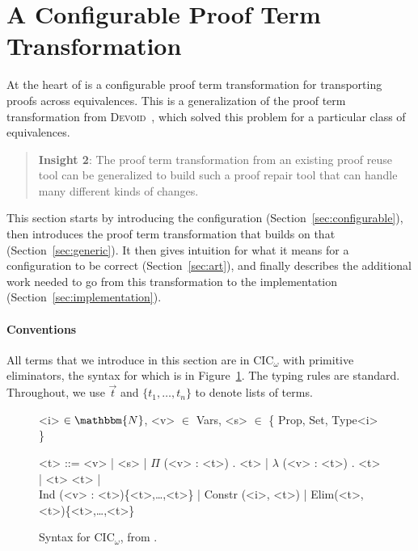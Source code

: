 \section{A Configurable Proof Term Transformation}
\label{sec:key2}

At the heart of \toolname is a configurable proof term transformation for transporting
proofs across equivalences. This is a generalization of the proof term transformation from 
\textsc{Devoid}~\cite{Ringer2019}, which solved this problem for a particular class of equivalences.

\begin{quote}
\textbf{Insight 2}:
The proof term transformation from an existing proof reuse tool can be generalized
to build such a proof repair tool that can handle 
many different kinds of changes.
\end{quote}

This section starts by introducing the configuration (Section~\ref{sec:configurable}),
then introduces the proof term transformation that builds on that (Section~\ref{sec:generic}).
It then gives intuition for what it means for a configuration to be correct (Section~\ref{sec:art}),
and finally describes the additional work needed to go from this transformation to the implementation (Section~\ref{sec:implementation}). 

\paragraph{Conventions}
All terms that we introduce in this section are in CIC$_{\omega}$ with primitive eliminators,
the syntax for which is in Figure~\ref{fig:syntax}.
The typing rules are standard.
Throughout, we use $\vec{t}$ and $\{t_1, \ldots, t_n\}$ to denote lists of terms.

\begin{figure}
\small
\begin{grammar}
<i> $\in \mathbbm{N}$, <v> $\in$ Vars, <s> $\in$ \{ Prop, Set, Type<i> \}

<t> ::= <v> | <s> | $\Pi$ (<v> : <t>) . <t> | $\lambda$ (<v> : <t>) . <t> | <t> <t> | \\ 
Ind (<v> : <t>)\{<t>,\ldots,<t>\} | Constr (<i>, <t>) | Elim(<t>, <t>)\{<t>,\ldots,<t>\}
\end{grammar}
\vspace{-0.3cm}
\caption{Syntax for CIC$_\omega$, from \citet{Timany2015FirstST}.}
\label{fig:syntax}
\end{figure}

